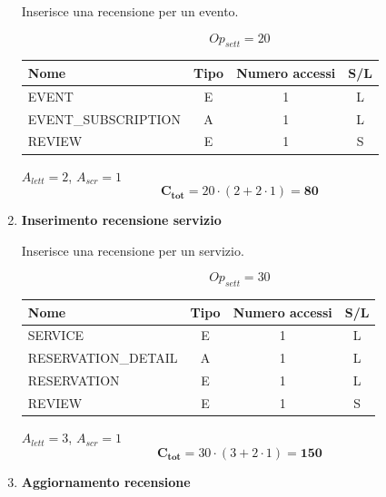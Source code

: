 \documentclass[a4paper,12pt]{report}
\begin{document}
\begin{enumerate}
    Inserisce una recensione per un evento.
    
    $$Op_{sett} = 20$$
    
    \begin{table}[H]
        \centering
        \small
        \renewcommand{\arraystretch}{1.15}
        \begin{tabularx}{0.8\textwidth}{|X|c|c|c|}
            \hline
            \rowcolor{gray!20}
            \textbf{Nome} & \textbf{Tipo} & \textbf{Numero accessi} & \textbf{S/L} \\
            \hline
            EVENT & E & 1 & L \\
            EVENT\_SUBSCRIPTION & A & 1 & L \\
            REVIEW & E & 1 & S \\
            \hline
        \end{tabularx}
    \end{table}
    
    $A_{lett} = 2$, $A_{scr} = 1$
    $$\mathbf{C_{tot}} = 20 \cdot (2 + 2 \cdot 1) = \mathbf{80}$$

    \item {\large \textbf{Inserimento recensione servizio}} \label{op10}
    
    Inserisce una recensione per un servizio.
    
    $$Op_{sett} = 30$$
    
    \begin{table}[H]
        \centering
        \small
        \renewcommand{\arraystretch}{1.15}
        \begin{tabularx}{0.8\textwidth}{|X|c|c|c|}
            \hline
            \rowcolor{gray!20}
            \textbf{Nome} & \textbf{Tipo} & \textbf{Numero accessi} & \textbf{S/L} \\
            \hline
            SERVICE & E & 1 & L \\
            RESERVATION\_DETAIL & A & 1 & L \\
            RESERVATION & E & 1 & L \\
            REVIEW & E & 1 & S \\
            \hline
        \end{tabularx}
    \end{table}
    
    $A_{lett} = 3$, $A_{scr} = 1$
    $$\mathbf{C_{tot}} = 30 \cdot (3 + 2 \cdot 1) = \mathbf{150}$$

    \item {\large \textbf{Aggiornamento recensione}} \label{op11}
    

\end{enumerate}
\end{document}
